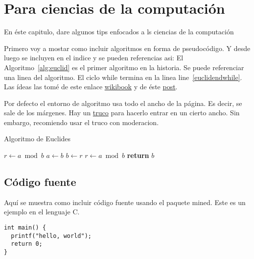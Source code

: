 \chapter{Para ciencias de la computación}
\label{chap:cs}

En éste capitulo, dare algunos tips enfocados a ls ciencias de la computación

Primero voy a mostar como incluir algoritmos en forma de pseudocódigo.
Y desde luego se incluyen en el indice y se pueden referencias asi: El Algoritmo~\ref{alg:euclid} es el primer algoritmo en la historia. Se puede referenciar una linea del algoritmo. El ciclo while termina en la linea line~\ref{euclidendwhile}. 
Las ídeas las tomé de este enlace \href{https://en.wikibooks.org/wiki/LaTeX/Algorithms#Typesetting_using_the_algorithmicx_package}{wikibook} y de éste \href{https://tex.stackexchange.com/questions/229355/algorithm-algorithmic-algorithmicx-algorithm2e-algpseudocode-confused}{post}.

Por defecto el entorno de algoritmo usa todo el ancho de la página.
Es decir, se sale de los márgenes.
Hay un \href{https://tex.stackexchange.com/questions/350434/adjust-width-of-algorithm-float}{truco} para hacerlo entrar en un cierto ancho. Sin embargo, recomiendo usar el truco con moderacion.

{\centering
\begin{minipage}{\linewidth}
  \begin{algorithm}[H]
    \caption{Algoritmo de Euclides}
    \label{alg:euclid}
    \begin{algorithmic}[1] %
       
        \State $r\gets a \bmod b$
         
          \State $a \gets b$
          \State $b \gets r$
          \State $r \gets a \bmod b$
        \EndWhile\label{euclidendwhile}
        \State \textbf{return} $b$
      \EndProcedure
    \end{algorithmic}
  \end{algorithm}
\end{minipage}
\par
}

\section{Código fuente}
Aquí se muestra como incluir código fuente usando el paquete mined.
Este es un ejemplo en el lenguaje C.
\begin{verbatim}
int main() {
  printf("hello, world");
  return 0;
}
\end{verbatim}

